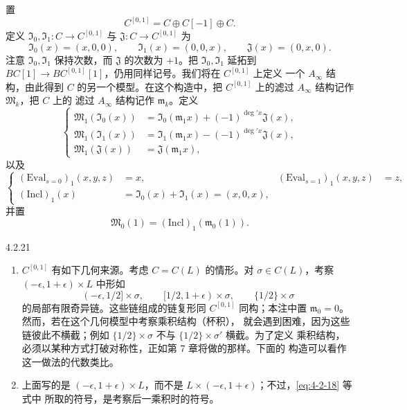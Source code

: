 置
\[
 C^{[0,1]}=C\oplus C[-1]\oplus C.
\]
定义 $\mathfrak I_0,\mathfrak I_1\colon C\to C^{[0,1]}$ 与
$\mathfrak J\colon C\to C^{[0,1]}$ 为
\[
 \mathfrak I_0(x)=(x,0,0),\qquad
 \mathfrak I_1(x)=(0,0,x),\qquad
 \mathfrak J(x)=(0,x,0).
\]
注意 $\mathfrak I_0,\mathfrak I_1$ 保持次数，而 $\mathfrak J$ 的次数为
$+1$。把 $\mathfrak I_0,\mathfrak I_1$ 延拓到
$BC[1]\to BC^{[0,1]}[1]$，仍用同样记号。我们将在 $C^{[0,1]}$ 上定义
一个 $A_\infty$ 结构，由此得到 $C$ 的另一个模型。在这个构造中，把
$C^{[0,1]}$ 上的滤过 $A_\infty$ 结构记作 $\mathfrak M_k$，把 $C$ 上的
滤过 $A_\infty$ 结构记作 $\mathfrak m_k$。定义
\begin{equation}
\left\{
\begin{aligned}
 \mathfrak M_1(\mathfrak I_0(x))
  &=\mathfrak I_0(\mathfrak m_1x)+(-1)^{\deg'x}\mathfrak J(x),\\
 \mathfrak M_1(\mathfrak I_1(x))
  &=\mathfrak I_1(\mathfrak m_1x)-(-1)^{\deg'x}\mathfrak J(x),\\
 \mathfrak M_1(\mathfrak J(x))&=\mathfrak J(\mathfrak m_1x),
\end{aligned}
\right.
\tag{4.2.18}\label{eq:4-2-18}
\end{equation}
以及
\begin{equation}
\left\{
\begin{aligned}
 (\mathrm{Eval}_{s=0})_1(x,y,z)&=x,
 & (\mathrm{Eval}_{s=1})_1(x,y,z)&=z,\\
 (\mathrm{Incl})_1(x)&=\mathfrak I_0(x)+\mathfrak I_1(x)=(x,0,x),
\end{aligned}
\right.
\tag{4.2.19}\label{eq:4-2-19}
\end{equation}
并置
\begin{equation}
 \mathfrak M_0(1)=(\mathrm{Incl})_1(\mathfrak m_0(1)).
\tag{4.2.20}\label{eq:4-2-20}
\end{equation}

\begin{remark}{4.2.21}\label{rem:4-2-21}
\begin{enumerate}[label=\textup{(\arabic*)},leftmargin=2.8em]
 \item $C^{[0,1]}$ 有如下几何来源。考虑 $C=C(L)$ 的情形。对
  $\sigma\in C(L)$，考察 $(-\epsilon,1+\epsilon)\times L$ 中形如
  \[
   (-\epsilon,1/2]\times\sigma,\qquad
   [1/2,1+\epsilon)\times\sigma,\qquad
   \{1/2\}\times\sigma
  \]
  的局部有限奇异链。这些链组成的链复形同 $C^{[0,1]}$ 同构；本注中置
  $\mathfrak m_0=0$。然而，若在这个几何模型中考察乘积结构（杯积），
  就会遇到困难，因为这些链彼此不横截；例如
  $\{1/2\}\times\sigma$ 不与 $\{1/2\}\times\sigma'$ 横截。为了定义
  乘积结构，必须以某种方式打破对称性，正如第 7 章将做的那样。下面的
  构造可以看作这一做法的代数类比。
 \item 上面写的是 $(-\epsilon,1+\epsilon)\times L$，而不是
  $L\times(-\epsilon,1+\epsilon)$；不过，\eqref{eq:4-2-18} 等式中
  所取的符号，是考察后一乘积时的符号。
\end{enumerate}
\end{remark}


